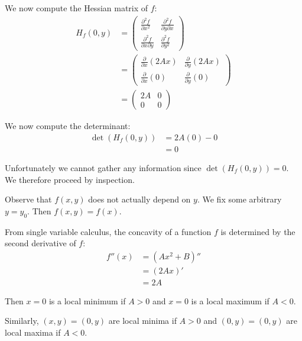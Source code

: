 \begin{solution}
    We now compute the Hessian matrix of \(f\):
    \begin{align*}
        H_f(0, y) &= 
        \begin{pmatrix}
            \frac{\partial^2 f}{\partial x^2} & \frac{\partial^2 f}{\partial y \partial x} \\
            \frac{\partial^2 f}{\partial x \partial y} & \frac{\partial^2 f}{\partial y^2} 
        \end{pmatrix} \\
        &= 
        \begin{pmatrix}
            \frac{\partial}{\partial x}(2Ax) & \frac{\partial}{\partial y}(2Ax) \\
            \frac{\partial}{\partial x}(0) & \frac{\partial}{\partial y}(0)
        \end{pmatrix} \\
        &= 
        \begin{pmatrix}
            2A & 0 \\
            0 & 0
        \end{pmatrix}
    \end{align*}
    
    We now compute the determinant:
    \begin{align}
        \det\left(H_f(0, y)\right) &= 2A(0) - 0 \\
        &= 0
    \end{align}
    
    Unfortunately we cannot gather any information since \(\det\left(H_f(0, y)\right) = 0\). We therefore proceed by inspection.
    
    Observe that \(f(x, y)\) does not actually depend on \(y\). We fix some arbitrary \(y = y_0\). Then \(f(x, y) = f(x)\).
    
    From single variable calculus, the concavity of a function \(f\) is determined by the second derivative of \(f\):
    \begin{align*}
        f''(x) &= (Ax^2 + B)'' \\
        &= (2Ax)' \\
        &= 2A
    \end{align*}
    
    Then \(x = 0\) is a local minimum if \(A > 0\) and \(x = 0\) is a local maximum if \(A < 0\).
    
    Similarly, \((x, y) = (0, y)\) are local minima if \(A > 0\) and \((0, y) = (0, y)\) are local maxima if \(A < 0\).
\end{solution}

